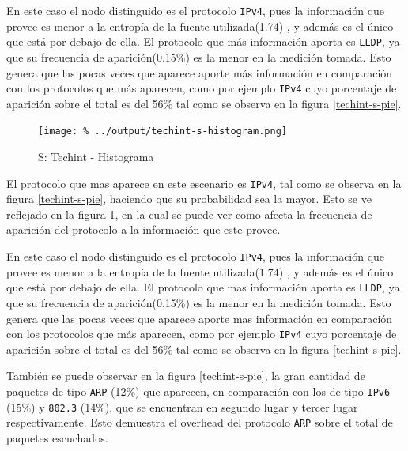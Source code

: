 \documentclass[final,inline,a4paper,narroweqnarray]{ieee}
\begin{document}
    En este caso el nodo distinguido es el protocolo \texttt{IPv4},
    pues la información que provee es menor a la entropía de la fuente
    utilizada(1.74) , y además es el único que está por debajo de
    ella. El protocolo que más información aporta es \texttt{LLDP}, ya
    que su frecuencia de aparición(0.15\%) es la menor en la medición
    tomada. Esto genera que las pocas veces que aparece aporte más
    información en comparación con los protocolos que más aparecen,
    como por ejemplo \texttt{IPv4} cuyo porcentaje de aparición sobre
    el total es del 56\% tal como se observa en la figura
    \ref{techint-s-pie}.


    \begin{figure}[ht]\begin{center}
      \texttt{[image: \%
      ../output/techint-s-histogram.png]}
      \caption{S: Techint - Histograma}
      \label{techint-s-histogram}
    \end{center}\end{figure}


    El protocolo que mas aparece en este escenario es \texttt{IPv4}, tal
    como se observa en la figura \ref{techint-s-pie}, haciendo que
    su probabilidad sea la
    mayor. Esto se ve reflejado en la figura \ref{techint-s-histogram},
    en la cual se puede ver como
    afecta la frecuencia de aparición del protocolo a la información
    que este provee.


    En este caso el nodo distinguido es el protocolo \texttt{IPv4},
    pues la información que provee es menor a la entropía de la fuente
    utilizada(1.74) , y además es el único que está por debajo de ella. El
    protocolo que mas información aporta es \texttt{LLDP}, ya que
    su frecuencia de aparición(0.15\%) es la menor en la medición tomada. Esto
    genera que las pocas veces que aparece aporte mas información en
    comparación con los protocolos que más aparecen, como por ejemplo
    \texttt{IPv4} cuyo porcentaje de aparición sobre el total es del 56\%
    tal como se observa en la figura \ref{techint-s-pie}.

    También se puede observar en la figura \ref{techint-s-pie}, la gran cantidad de paquetes 
    de tipo \texttt{ARP} (12\%) que aparecen, en comparación con los
    de tipo \texttt{IPv6} (15\%) y \texttt{802.3} (14\%), que se encuentran
    en segundo lugar y tercer lugar respectivamente. Esto demuestra el overhead
    del protocolo \texttt{ARP} sobre el total de paquetes escuchados.
\end{document}
